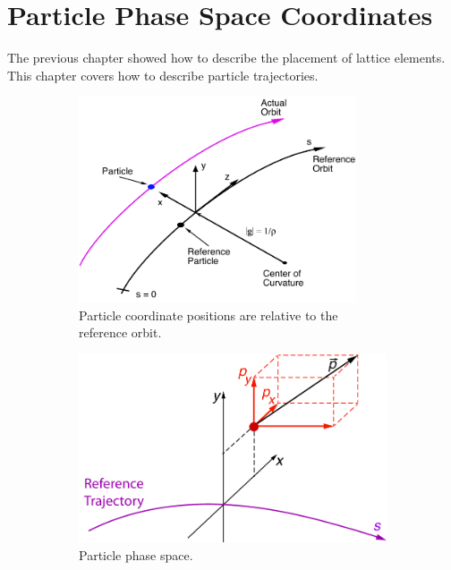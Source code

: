 \documentclass{hitec}     %
\newcommand{\Section}[1]{\section{#1}\vspace*{-1ex}}
\begin{document}
\newpage

\Section{Particle Phase Space Coordinates}
\label{s:phase.space}

The previous chapter showed how to describe the placement of lattice elements. This chapter
covers how to describe particle trajectories. 

\begin{figure}[tb]
  \centering
  \begin{subfigure}[t]{0.48\textwidth}
    \includegraphics[width=0.9\textwidth]{local-coords.pdf}
    \caption{Particle coordinate positions are relative to the reference orbit.}
    \label{f:part.coords}
  \end{subfigure}
  \hfil
  \begin{subfigure}[t]{0.48\textwidth}
    \includegraphics[width=\textwidth]{CoordinateSystem1.pdf}
    \caption{Particle phase space.}
    \label{f:phase.space}
  \end{subfigure}
  \caption{}
\end{figure}
\end{document}
